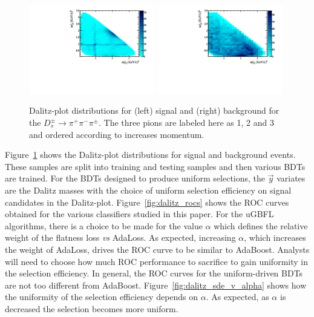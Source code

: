 \begin{figure}[] 
  \centering 
  \includegraphics[width=0.49\textwidth]{graphs2/DP_sig.pdf}
  \includegraphics[width=0.49\textwidth]{graphs2/DP_bkgd.pdf}
  \caption{\label{fig:dalitz} Dalitz-plot distributions for (left) signal and (right) background for the $D_s^\pm\to\pi^+\pi^-\pi^\pm$.  The three pions are labeled here as 1, 2 and 3 and ordered according to increases momentum.}
\end{figure}

Figure~\ref{fig:dalitz} shows the Dalitz-plot distributions for signal and background events.  These samples are split into training and testing samples and then various BDTs are trained.  For the BDTs designed to produce uniform selections, the $\vec{y}$ variates are the Dalitz masses with the choice of uniform selection efficiency on signal candidates in the Dalitz-plot.  
Figure~\ref{fig:dalitz_rocs} shows the ROC curves obtained for the various classifiers studied in this paper.  For the uGBFL algorithms, there is a choice to be made for the value $\alpha$ which defines the relative weight of the flatness loss {\em vs} AdaLoss.  As expected, increasing $\alpha$, which increases the weight of AdaLoss, drives the ROC curve to be similar to AdaBoost.  Analysts will need to choose how much ROC performance to sacrifice to gain uniformity in the selection efficiency.  In general, the ROC curves for the uniform-driven BDTs are not too different from AdaBoost.  Figure~\ref{fig:dalitz_sde_v_alpha} shows how the uniformity of the selection efficiency depends on $\alpha$.  As expected, as $\alpha$ is decreased the selection becomes more uniform.



